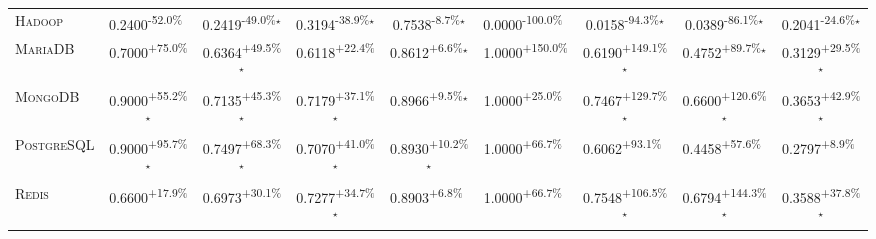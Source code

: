 \begin{table}[htbp]
\begin{tabular}{l|cccc|cccc}
\textsc{Hadoop} & \cellcolor{red!30}0.2400\textsuperscript{-52.0\%}$^{\,\,\,}$ & \cellcolor{red!30}0.2419\textsuperscript{-49.0\%}$^\star$ & \cellcolor{red!30}0.3194\textsuperscript{-38.9\%}$^\star$ & \cellcolor{red!30}0.7538\textsuperscript{-8.7\%}$^\star$ & \cellcolor{red!30}0.0000\textsuperscript{-100.0\%}$^{\,\,\,}$ & \cellcolor{red!30}0.0158\textsuperscript{-94.3\%}$^\star$ & \cellcolor{red!30}0.0389\textsuperscript{-86.1\%}$^\star$ & \cellcolor{red!30}0.2041\textsuperscript{-24.6\%}$^\star$ \\
\textsc{MariaDB} & \cellcolor{green!30}0.7000\textsuperscript{+75.0\%}$^{\,\,\,}$ & \cellcolor{green!30}0.6364\textsuperscript{+49.5\%}$^\star$ & \cellcolor{green!30}0.6118\textsuperscript{+22.4\%}$^{\,\,\,}$ & \cellcolor{green!30}0.8612\textsuperscript{+6.6\%}$^\star$ & \cellcolor{green!30}1.0000\textsuperscript{+150.0\%}$^{\,\,\,}$ & \cellcolor{green!30}0.6190\textsuperscript{+149.1\%}$^\star$ & \cellcolor{green!30}0.4752\textsuperscript{+89.7\%}$^\star$ & \cellcolor{green!30}0.3129\textsuperscript{+29.5\%}$^\star$ \\
\textsc{MongoDB} & \cellcolor{green!30}0.9000\textsuperscript{+55.2\%}$^\star$ & \cellcolor{green!30}0.7135\textsuperscript{+45.3\%}$^\star$ & \cellcolor{green!30}0.7179\textsuperscript{+37.1\%}$^\star$ & \cellcolor{green!30}0.8966\textsuperscript{+9.5\%}$^\star$ & \cellcolor{green!30}1.0000\textsuperscript{+25.0\%}$^{\,\,\,}$ & \cellcolor{green!30}0.7467\textsuperscript{+129.7\%}$^\star$ & \cellcolor{green!30}0.6600\textsuperscript{+120.6\%}$^\star$ & \cellcolor{green!30}0.3653\textsuperscript{+42.9\%}$^\star$ \\
\textsc{PostgreSQL} & \cellcolor{green!30}0.9000\textsuperscript{+95.7\%}$^\star$ & \cellcolor{green!30}0.7497\textsuperscript{+68.3\%}$^\star$ & \cellcolor{green!30}0.7070\textsuperscript{+41.0\%}$^\star$ & \cellcolor{green!30}0.8930\textsuperscript{+10.2\%}$^\star$ & \cellcolor{green!30}1.0000\textsuperscript{+66.7\%}$^{\,\,\,}$ & \cellcolor{green!30}0.6062\textsuperscript{+93.1\%}$^{\,\,\,}$ & \cellcolor{green!30}0.4458\textsuperscript{+57.6\%}$^{\,\,\,}$ & \cellcolor{green!30}0.2797\textsuperscript{+8.9\%}$^{\,\,\,}$ \\
\textsc{Redis} & \cellcolor{green!30}0.6600\textsuperscript{+17.9\%}$^{\,\,\,}$ & \cellcolor{green!30}0.6973\textsuperscript{+30.1\%}$^{\,\,\,}$ & \cellcolor{green!30}0.7277\textsuperscript{+34.7\%}$^\star$ & \cellcolor{green!30}0.8903\textsuperscript{+6.8\%}$^{\,\,\,}$ & \cellcolor{green!30}1.0000\textsuperscript{+66.7\%}$^{\,\,\,}$ & \cellcolor{green!30}0.7548\textsuperscript{+106.5\%}$^\star$ & \cellcolor{green!30}0.6794\textsuperscript{+144.3\%}$^\star$ & \cellcolor{green!30}0.3588\textsuperscript{+37.8\%}$^\star$ \\

\end{tabular}
\end{table}
